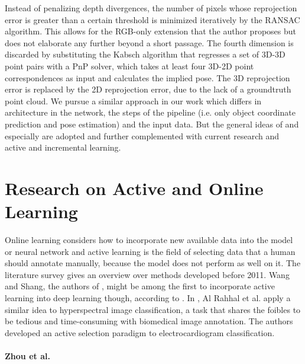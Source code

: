 \nnewline
Instead of penalizing depth divergences, the number of pixels whose reprojection error is greater than a certain threshold is minimized iteratively by the RANSAC algorithm. This allows for the RGB-only extension that the author proposes but does not elaborate any further beyond a short passage. The fourth dimension is discarded by substituting the Kabsch algorithm that regresses a set of 3D-3D point pairs with a PnP solver, which takes at least four 3D-2D point correspondences as input and calculates the implied pose. The 3D reprojection error is replaced by the 2D reprojection error, due to the lack of a groundtruth point cloud. We pursue a similar approach in our work which differs in architecture in the network, the steps of the pipeline (i.e. only object coordinate prediction and pose estimation) and the input data. But the general ideas of \cite{pertsch} and especially \cite{brachmann1} are adopted and further complemented with current research and active and incremental learning.

\section{Research on Active and Online Learning}

Online learning considers how to incorporate new available data into the model or neural network and active learning is the field of selecting data that a human should annotate manually, because the model does not perform as well on it. The literature survey\cite{activesurvey} gives an overview over methods developed before 2011. Wang and Shang, the authors of \cite{dwang}, might be among the first to incorporate active learning into deep learning though, according to \cite{zhou}. In \cite{hyperspectral}, Al Rahhal et al. apply a similar idea to hyperspectral image classification, a task that shares the foibles to be tedious and time-consuming with biomedical image annotation. The authors developed an active selection paradigm to electrocardiogram classification. 

\paragraph{Zhou et al.}

